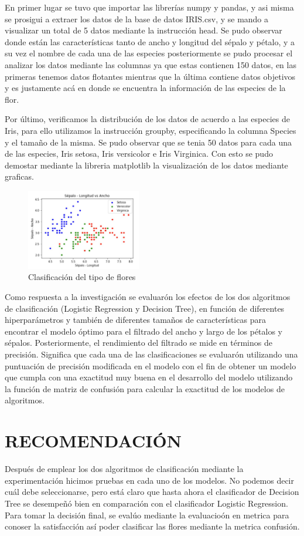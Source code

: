 \documentclass[letterpaper]{article}
\begin{document}
En primer lugar se tuvo que importar las librerías numpy y pandas, y asi misma se prosigui a extraer los datos de la base de datos IRIS.csv, y se mando a visualizar un total de 5 datos mediante la instrucción head. Se pudo observar donde están las características tanto de ancho y longitud del sépalo y pétalo, y a su vez el nombre de cada una de las especies posteriormente se pudo procesar el analizar los datos mediante las columnas ya que estas contienen 150 datos, en las primeras tenemos datos flotantes mientras que la última contiene datos objetivos y es justamente acá en donde se encuentra la información de las especies de la flor.

Por último, verificamos la distribución de los datos de acuerdo a las especies de Iris, para ello utilizamos la instrucción groupby, especificando la columna Species y el tamaño de la misma. Se pudo observar que se tenia 50 datos para cada una de las especies, Iris setosa, Iris versicolor e Iris Virginica. Con esto se pudo demostar mediante la libreria matplotlib la visualización de los datos mediante graficas.

\begin{figure}[h]
    \centering
    \includegraphics[width=5cm]{sepalo.jpg}
    \caption{Clasificación del tipo de flores}
\end{figure}

 Como respuesta a la investigación se evaluarón los efectos de los dos algoritmos de clasificación (Logistic Regression y Decision Tree), en función de diferentes hiperparámetros y también de diferentes tamaños de características para encontrar el modelo óptimo para el filtrado del ancho y largo de los pétalos y sépalos. Posteriormente, el rendimiento del filtrado se mide en términos de precisión. Significa que cada una de las clasificaciones se evaluarón utilizando una puntuación de precisión modificada en el modelo con el fin de obtener un modelo que cumpla con una exactitud muy buena en el desarrollo del modelo utilizando la función de matriz de confusión para calcular la exactitud de los modelos de algoritmos.

\section{RECOMENDACIÓN}
 Después de emplear los dos algoritmos de clasificación mediante la experimentación hicimos pruebas en cada uno de
los modelos. No podemos decir cuál debe seleccionarse, pero está
claro que hasta ahora el clasificador de Decision Tree se desempeñó bien en comparación con el clasificador Logistic Regression. Para tomar la decisión final, se evalúo mediante la evaluacioón en metrica para conoser la satisfacción así poder clasificar las flores mediante la metrica confusión.
\end{document}
